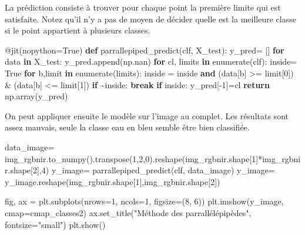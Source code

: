 \documentclass[
  11pt,
  letterpaper,
  open=any,
  twoside=false,
  french]{scrbook}
\newenvironment{Shaded}{\begin{snugshade}}{\end{snugshade}}
\newcommand{\AttributeTok}[1]{\textcolor[rgb]{0.40,0.45,0.13}{#1}}
\newcommand{\BuiltInTok}[1]{\textcolor[rgb]{0.00,0.23,0.31}{#1}}
\newcommand{\ControlFlowTok}[1]{\textcolor[rgb]{0.00,0.23,0.31}{\textbf{#1}}}
\newcommand{\DecValTok}[1]{\textcolor[rgb]{0.68,0.00,0.00}{#1}}
\newcommand{\KeywordTok}[1]{\textcolor[rgb]{0.00,0.23,0.31}{\textbf{#1}}}
\newcommand{\NormalTok}[1]{\textcolor[rgb]{0.00,0.23,0.31}{#1}}
\newcommand{\OperatorTok}[1]{\textcolor[rgb]{0.37,0.37,0.37}{#1}}
\newcommand{\StringTok}[1]{\textcolor[rgb]{0.13,0.47,0.30}{#1}}
\newcommand{\VariableTok}[1]{\textcolor[rgb]{0.07,0.07,0.07}{#1}}
\begin{document}
La prédiction consiste à trouver pour chaque point la première limite
qui est satisfaite. Notez qu'il n'y a pas de moyen de décider quelle est
la meilleure classe si le point appartient à plusieurs classes.

\begin{Shaded}
\begin{Highlighting}[]
\AttributeTok{@jit}\NormalTok{(nopython}\OperatorTok{=}\VariableTok{True}\NormalTok{)}
\KeywordTok{def}\NormalTok{ parrallepiped\_predict(clf, X\_test):}
\NormalTok{  y\_pred}\OperatorTok{=}\NormalTok{ []}
  \ControlFlowTok{for}\NormalTok{ data }\KeywordTok{in}\NormalTok{ X\_test:}
\NormalTok{    y\_pred.append(np.nan)}
    \ControlFlowTok{for}\NormalTok{ cl, limits }\KeywordTok{in} \BuiltInTok{enumerate}\NormalTok{(clf):}
\NormalTok{      inside}\OperatorTok{=} \VariableTok{True}
      \ControlFlowTok{for}\NormalTok{ b,limit }\KeywordTok{in} \BuiltInTok{enumerate}\NormalTok{(limits):}
\NormalTok{        inside }\OperatorTok{=}\NormalTok{ inside }\KeywordTok{and}\NormalTok{ (data[b] }\OperatorTok{\textgreater{}=}\NormalTok{ limit[}\DecValTok{0}\NormalTok{]) }\OperatorTok{\&}\NormalTok{ (data[b] }\OperatorTok{\textless{}=}\NormalTok{ limit[}\DecValTok{1}\NormalTok{])}
        \ControlFlowTok{if} \OperatorTok{\textasciitilde{}}\NormalTok{inside:}
          \ControlFlowTok{break}
      \ControlFlowTok{if}\NormalTok{ inside:}
\NormalTok{        y\_pred[}\OperatorTok{{-}}\DecValTok{1}\NormalTok{]}\OperatorTok{=}\NormalTok{cl}
  \ControlFlowTok{return}\NormalTok{ np.array(y\_pred)}
\end{Highlighting}
\end{Shaded}

On peut appliquer ensuite le modèle sur l'image au complet. Les
résultats sont assez mauvais, seule la classe eau en bleu semble être
bien classifiée.

\begin{Shaded}
\begin{Highlighting}[]
\NormalTok{data\_image}\OperatorTok{=}\NormalTok{ img\_rgbnir.to\_numpy().transpose(}\DecValTok{1}\NormalTok{,}\DecValTok{2}\NormalTok{,}\DecValTok{0}\NormalTok{).reshape(img\_rgbnir.shape[}\DecValTok{1}\NormalTok{]}\OperatorTok{*}\NormalTok{img\_rgbnir.shape[}\DecValTok{2}\NormalTok{],}\DecValTok{4}\NormalTok{)}
\NormalTok{y\_image}\OperatorTok{=}\NormalTok{ parrallepiped\_predict(clf, data\_image)}
\NormalTok{y\_image}\OperatorTok{=}\NormalTok{ y\_image.reshape(img\_rgbnir.shape[}\DecValTok{1}\NormalTok{],img\_rgbnir.shape[}\DecValTok{2}\NormalTok{])}

\NormalTok{fig, ax }\OperatorTok{=}\NormalTok{ plt.subplots(nrows}\OperatorTok{=}\DecValTok{1}\NormalTok{, ncols}\OperatorTok{=}\DecValTok{1}\NormalTok{, figsize}\OperatorTok{=}\NormalTok{(}\DecValTok{8}\NormalTok{, }\DecValTok{6}\NormalTok{))}
\NormalTok{plt.imshow(y\_image, cmap}\OperatorTok{=}\NormalTok{cmap\_classes2)}
\NormalTok{ax.set\_title(}\StringTok{"Méthode des parrallélépipèdes"}\NormalTok{, fontsize}\OperatorTok{=}\StringTok{"small"}\NormalTok{)}
\NormalTok{plt.show()}
\end{Highlighting}
\end{Shaded}
\end{document}
